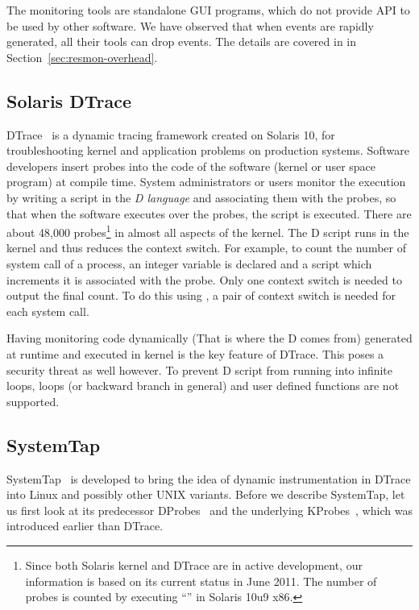 The monitoring tools are standalone GUI programs, which do not
provide API to be used by other software.
We have observed that when events are rapidly generated, all their tools
can drop events.
The details are covered in in Section~\ref{sec:resmon-overhead}.

\subsection{Solaris DTrace}
\label{sec:dtrace}

DTrace~\cite{cantrill2004dynamic} is a dynamic tracing framework
created on Solaris 10, for troubleshooting kernel and application problems
on production systems.
Software developers insert probes into the code of the software
(kernel or user space program) at compile time.
System administrators or users monitor the execution by writing
a script in the {\em D language} and associating them with the probes,
so that when the software executes over the probes, the script is executed.
There are about 48,000 probes\footnote{
Since both Solaris kernel and DTrace are in active development,
our information is based on its current status in June 2011.
The number of probes is counted by executing ``''
in Solaris 10u9 x86.
}
in almost all aspects of the kernel.
The D script runs in the kernel and thus reduces the context switch.
For example, to count the number of  system call of a process,
an integer variable is declared and a script which increments it
is associated with the  probe.
Only one context switch is needed to output the final count.
To do this using , a pair of context switch is
needed for each  system call.

Having monitoring code dynamically (That is where the D comes from)
generated at runtime and executed in kernel is the key feature of
DTrace.
This poses a security threat as well however.
To prevent D script from running into infinite loops,
loops (or backward branch in general) and user defined functions
are not supported.

\subsection{SystemTap}
\label{sec:systemtap}

SystemTap~\cite{prasad2005systemtap} is developed to bring the idea of dynamic instrumentation
in DTrace into Linux and possibly other UNIX variants.
Before we describe SystemTap, let us first look at its predecessor
DProbes~\cite{moore2001dprobes,bhattacharya2003dynamic} and
the underlying KProbes~\cite{mavinakayanahalli2006kprobes},
which was introduced earlier than DTrace.

